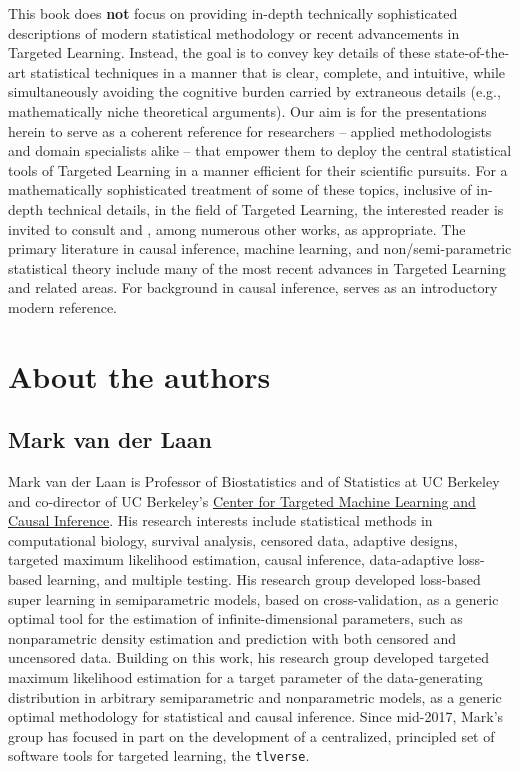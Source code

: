 \documentclass[
  12pt, krantz2,
]{krantz}
\newcommand{\passthrough}[1]{#1}
\newcommand{\1}{\mathbbm{1}}
\theoremstyle{definition}
\theoremstyle{definition}
\theoremstyle{definition}
\theoremstyle{definition}
\theoremstyle{remark}
\begin{document}
This book does \textbf{not} focus on providing in-depth technically sophisticated
descriptions of modern statistical methodology or recent advancements in
Targeted Learning. Instead, the goal is to convey key details of these
state-of-the-art statistical techniques in a manner that is clear, complete, and
intuitive, while simultaneously avoiding the cognitive burden carried by
extraneous details (e.g., mathematically niche theoretical arguments). Our aim
is for the presentations herein to serve as a coherent reference for researchers
-- applied methodologists and domain specialists alike -- that empower them to
deploy the central statistical tools of Targeted Learning in a manner efficient
for their scientific pursuits. For a mathematically sophisticated treatment of
some of these topics, inclusive of in-depth technical details, in the field of
Targeted Learning, the interested reader is invited to consult \citet{vdl2011targeted}
and \citet{vdl2018targeted}, among numerous other works, as appropriate. The primary
literature in causal inference, machine learning, and non/semi-parametric
statistical theory include many of the most recent advances in Targeted Learning
and related areas. For background in causal inference, \citet{hernan2022causal} serves
as an introductory modern reference.

\hypertarget{about-the-authors}{%
\section*{About the authors}\label{about-the-authors}}


\hypertarget{mark-van-der-laan}{%
\subsection*{Mark van der Laan}\label{mark-van-der-laan}}


Mark van der Laan is Professor of Biostatistics and of Statistics at UC Berkeley
and co-director of UC Berkeley's \href{https://ctml.berkeley.edu/}{Center for Targeted Machine Learning and
Causal Inference}. His research interests include
statistical methods in computational biology, survival analysis, censored data,
adaptive designs, targeted maximum likelihood estimation, causal inference,
data-adaptive loss-based learning, and multiple testing. His research group
developed loss-based super learning in semiparametric models, based on
cross-validation, as a generic optimal tool for the estimation of
infinite-dimensional parameters, such as nonparametric density estimation and
prediction with both censored and uncensored data. Building on this work, his
research group developed targeted maximum likelihood estimation for a target
parameter of the data-generating distribution in arbitrary semiparametric and
nonparametric models, as a generic optimal methodology for statistical and
causal inference. Since mid-2017, Mark's group has focused in part on the
development of a centralized, principled set of software tools for targeted
learning, the \passthrough{\lstinline!tlverse!}.
\end{document}
